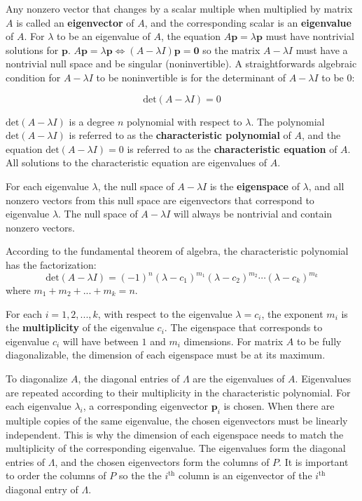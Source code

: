 \documentclass{article}
\begin{document}
Any nonzero vector that changes by a scalar multiple when multiplied by matrix \(A\) is called an {\bf eigenvector} of \(A\), and the corresponding scalar is an {\bf eigenvalue} of \(A\). For \(\lambda\) to be an eigenvalue of \(A\), the equation \(A\mathbf{p} = \lambda\mathbf{p}\) must have nontrivial solutions for \(\mathbf{p}\). \(A\mathbf{p} = \lambda\mathbf{p} \iff (A - \lambda I)\mathbf{p} = \mathbf{0}\) so the matrix \(A - \lambda I\) must have a nontrivial null space and be singular (noninvertible). A straightforwards algebraic condition for \(A - \lambda I\) to be noninvertible is for the determinant of \(A - \lambda I\) to be \(0\):

\[\text{det}(A - \lambda I) = 0\]

\(\text{det}(A - \lambda I)\) is a degree \(n\) polynomial with respect to \(\lambda\). The polynomial \(\text{det}(A - \lambda I)\) is referred to as the {\bf characteristic polynomial} of \(A\), and the equation \(\text{det}(A - \lambda I) = 0\) is referred to as the {\bf characteristic equation} of \(A\). All solutions to the characteristic equation are eigenvalues of \(A\). 

For each eigenvalue \(\lambda\), the null space of \(A - \lambda I\) is the {\bf eigenspace} of \(\lambda\), and all nonzero vectors from this null space are eigenvectors that correspond to eigenvalue \(\lambda\). The null space of \(A - \lambda I\) will always be nontrivial and contain nonzero vectors. 

According to the fundamental theorem of algebra, the characteristic polynomial has the factorization:
\[\text{det}(A - \lambda I) = (-1)^n(\lambda - c_1)^{m_1}(\lambda - c_2)^{m_2} \cdots (\lambda - c_k)^{m_k}\]
where \(m_1 + m_2 + ... + m_k = n\).

For each \(i = 1, 2, ..., k\), with respect to the eigenvalue \(\lambda = c_i\), the exponent \(m_i\) is the {\bf multiplicity} of the eigenvalue \(c_i\). The eigenspace that corresponds to eigenvalue \(c_i\) will have between \(1\) and \(m_i\) dimensions. For matrix \(A\) to be fully diagonalizable, the dimension of each eigenspace must be at its maximum. 

To diagonalize \(A\), the diagonal entries of \(\Lambda\) are the eigenvalues of \(A\). Eigenvalues are repeated according to their multiplicity in the characteristic polynomial. For each eigenvalue \(\lambda_i\), a corresponding eigenvector \(\mathbf{p}_i\) is chosen. When there are multiple copies of the same eigenvalue, the chosen eigenvectors must be linearly independent. This is why the dimension of each eigenspace needs to match the multiplicity of the corresponding eigenvalue. The eigenvalues form the diagonal entries of \(\Lambda\), and the chosen eigenvectors form the columns of \(P\). It is important to order the columns of \(P\) so the the \(i^{\text{th}}\) column is an eigenvector of the \(i^{\text{th}}\) diagonal entry of \(\Lambda\). 
  
\end{document}
